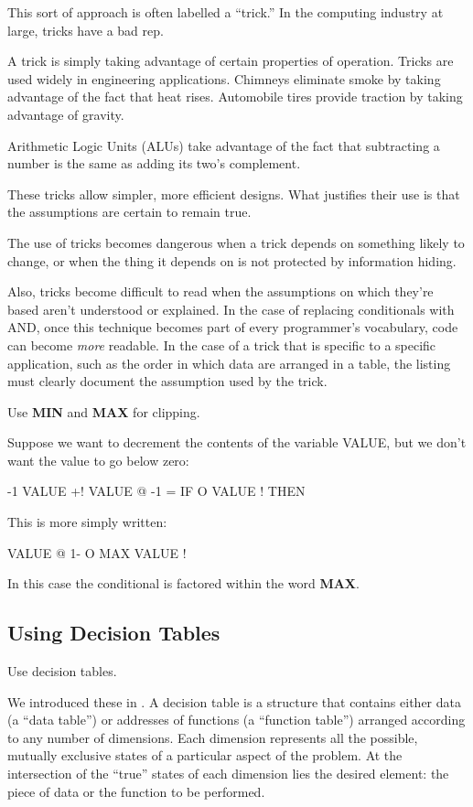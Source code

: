 This sort of approach is often labelled a ``trick.'' In the computing
industry at large, tricks have a bad rep.

A trick is simply taking advantage of certain properties of operation.
Tricks are used widely in engineering applications. Chimneys
eliminate smoke by taking advantage of the fact that heat rises.
Automobile tires provide traction by taking advantage of gravity.

Arithmetic Logic Units (ALUs) take advantage of the fact that
subtracting a number is the same as adding its two's complement.

These tricks allow simpler, more efficient designs. What justifies
their use is that the assumptions are certain to remain true.

The use of tricks becomes dangerous when a trick depends on something
likely to change, or when the thing it depends on is not protected by
information hiding.

Also, tricks become difficult to read when the assumptions on which
they're based aren't understood or explained. In the case of replacing
conditionals with AND, once this technique becomes part of every
programmer's vocabulary, code can become \emph{more} readable. In the case of
a trick that is specific to a specific application, such as the order in which
data are arranged in a table, the listing must clearly document the
assumption used by the trick.

\begin{tip}
Use \textbf{MIN} and \textbf{MAX} for clipping.
\end{tip}
Suppose we want to decrement the contents of the variable VALUE, but
we don't want the value to go below zero:

\begin{Code}
-1 VALUE +!  VALUE @  -1 = IF  O VALUE !  THEN
\end{Code}
This is more simply written:

\begin{Code}
VALUE @  1-  O MAX  VALUE !
\end{Code}
In this case the conditional is factored within the word \textbf{MAX}.

\subsection{Using Decision Tables}

\begin{tip}
Use decision tables.
\end{tip}
We introduced these in . A decision table is a structure that
contains either data (a ``data table'') or addresses of functions (a
``function table'') arranged according to any number of dimensions. Each
dimension represents all the possible, mutually exclusive states of a
particular aspect of the problem. At the intersection of the ``true'' states
of each dimension lies the desired element: the piece of data or the function
to be performed.

